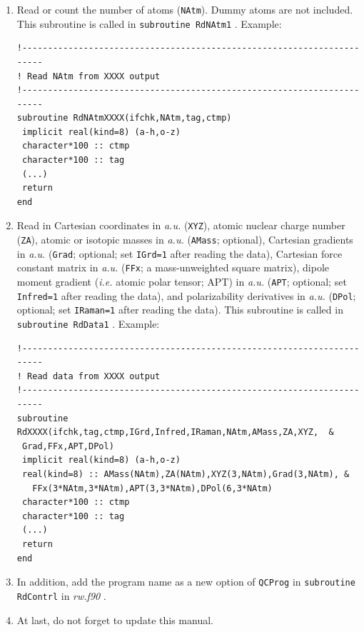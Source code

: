 \documentclass[12pt,english]{extarticle}
\begin{document}
\begin{enumerate}
\item Read or count the number of atoms (\verb|NAtm|). Dummy atoms are not included. This subroutine is called in \verb|subroutine RdNAtm1| . Example:
\begin{lstlisting}[language={[90]Fortran}]
!-----------------------------------------------------------------------
! Read NAtm from XXXX output
!-----------------------------------------------------------------------
subroutine RdNAtmXXXX(ifchk,NAtm,tag,ctmp)
 implicit real(kind=8) (a-h,o-z)
 character*100 :: ctmp
 character*100 :: tag
 (...)
 return
end
\end{lstlisting}

\item Read in Cartesian coordinates in \emph{a.u.} (\verb|XYZ|), atomic nuclear charge number (\verb|ZA|), atomic or isotopic masses in \emph{a.u.}
  (\verb|AMass|; optional), Cartesian gradients in \emph{a.u.} (\verb|Grad|; optional; set \verb|IGrd=1| after reading the data),
  Cartesian force constant matrix in \emph{a.u.} (\verb|FFx|; a mass-unweighted square matrix),
  dipole moment gradient (\emph{i.e.} atomic polar tensor; APT) in \emph{a.u.} (\verb|APT|; optional; set \verb|Infred=1| after reading the data),
  and polarizability derivatives in \emph{a.u.} (\verb|DPol|; optional; set \verb|IRaman=1| after reading the data).
  This subroutine is called in \verb|subroutine RdData1| . Example:
\begin{lstlisting}[language={[90]Fortran}]
!-----------------------------------------------------------------------
! Read data from XXXX output
!-----------------------------------------------------------------------
subroutine RdXXXX(ifchk,tag,ctmp,IGrd,Infred,IRaman,NAtm,AMass,ZA,XYZ,  &
 Grad,FFx,APT,DPol)
 implicit real(kind=8) (a-h,o-z)
 real(kind=8) :: AMass(NAtm),ZA(NAtm),XYZ(3,NAtm),Grad(3,NAtm), &
   FFx(3*NAtm,3*NAtm),APT(3,3*NAtm),DPol(6,3*NAtm)
 character*100 :: ctmp
 character*100 :: tag
 (...)
 return
end
\end{lstlisting}

\item In addition, add the program name as a new option of \verb|QCProg| in \verb|subroutine RdContrl| in \emph{rw.f90} .

\item At last, do not forget to update this manual.
\end{enumerate}

\pagebreak{}

{}
\printindex
\end{document}
